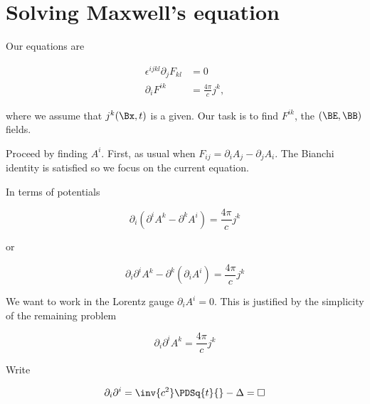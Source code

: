 %
%
\section{Solving Maxwell's equation}

Our equations are

\begin{equation}\label{eqn:relativisticElectrodynamicsL17b:210}
\begin{aligned}
\epsilon^{i j k l} \partial_j F_{k l} &= 0 \\
\partial_i F^{i k} &= \frac{4 \pi}{c} j^k,
\end{aligned}
\end{equation}

where we assume that $j^k(\Bx, t)$ is a given.  Our task is to find $F^{i k}$, the $(\BE, \BB)$ fields.

Proceed by finding $A^i$.  First, as usual when $F_{i j} = \partial_i A_j - \partial_j A_i$.  The Bianchi identity is satisfied so we focus on the current equation.

In terms of potentials

\begin{equation}\label{eqn:relativisticElectrodynamicsL17b:230}
\partial_i (\partial^i A^k - \partial^k A^i) = \frac{ 4 \pi}{c} j^k
\end{equation}

or

\begin{equation}\label{eqn:relativisticElectrodynamicsL17b:250}
\partial_i \partial^i A^k - \partial^k (\partial_i A^i) = \frac{ 4 \pi}{c} j^k
\end{equation}

We want to work in the Lorentz gauge $\partial_i A^i = 0$.  This is justified by the simplicity of the remaining problem

\begin{equation}\label{eqn:relativisticElectrodynamicsL17b:270}
\partial_i \partial^i A^k = \frac{4 \pi}{c} j^k
\end{equation}

Write

\begin{equation}\label{eqn:relativisticElectrodynamicsL17b:290}
\partial_i \partial^i = \inv{c^2} \PDSq{t}{} - \Delta = \square
\end{equation}

